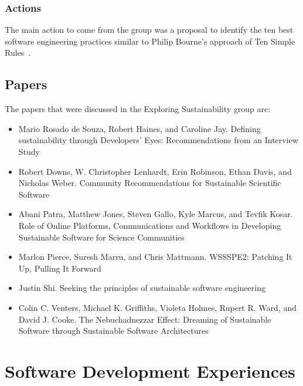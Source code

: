 \documentclass[11pt, oneside]{amsart}
\newcommand{\todo}[1]{{\color{blue}$\blacksquare$~\textsf{[TODO: #1]}}}
\begin{document}
\subsubsection{Actions}

The main action to come from the group was a proposal to identify the ten best
software engineering practices similar to Philip Bourne's approach of Ten Simple
Rules~\cite{bourne-ten-simple-rules}.

\subsection{Papers}
The papers that were discussed in the Exploring Sustainability group are:
\begin{itemize}
\item Mario Rosado de Souza, Robert Haines, and Caroline Jay. Defining
sustainability through Developers' Eyes: Recommendations from an Interview
Study~\cite{wssspe2_rosada_de_souza}

\item Robert Downs, W. Christopher Lenhardt, Erin Robinson, Ethan Davis, and
Nicholas Weber. Community Recommendations for Sustainable Scientific
Software~\cite{wssspe2_downs}

\item Abani Patra, Matthew Jones, Steven Gallo, Kyle Marcus, and Tevfik Kosar.
Role of Online Platforms, Communications and Workflows in Developing Sustainable
Software for Science Communities~\cite{wssspe2_patra}

\item Marlon Pierce, Suresh Marru, and Chris Mattmann. {WSSSPE2}: Patching It Up,
Pulling It Forward~\cite{wssspe2_pierce}

\item Justin Shi. Seeking the principles of sustainable software
engineering~\cite{wssspe2_shi}

\item Colin C. Venters, Michael K. Griffiths, Violeta Holmes, Rupert R. Ward, and
David J. Cooke. The Nebuchadnezzar Effect: Dreaming of Sustainable Software
through Sustainable Software Architectures~\cite{wssspe2_venters}
\end{itemize}

\section{Software Development Experiences} \label{sec:devel}
\end{document}
